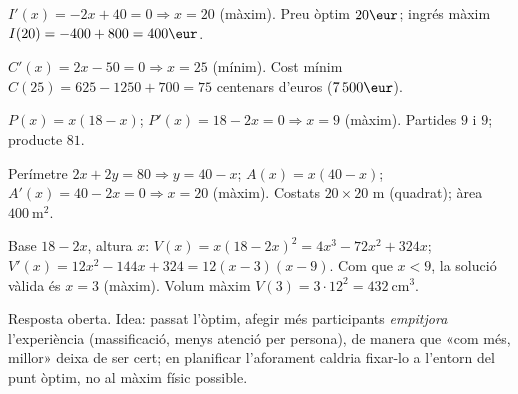 \begin{solucions}
\begin{sollist}
  \item $I'(x)=-2x+40=0\Rightarrow x=20$ (màxim). Preu òptim $20\eur$; ingrés màxim
        $I(20)=-400+800=400\eur$.
  \item $C'(x)=2x-50=0\Rightarrow x=25$ (mínim). Cost mínim $C(25)=625-1250+700=75$
        centenars d'euros ($7\,500\eur$).
  \item $P(x)=x(18-x)$; $P'(x)=18-2x=0\Rightarrow x=9$ (màxim). Partides $9$ i $9$;
        producte $81$.
  \item Perímetre $2x+2y=80\Rightarrow y=40-x$; $A(x)=x(40-x)$;
        $A'(x)=40-2x=0\Rightarrow x=20$ (màxim). Costats $20\times 20$ m (quadrat); àrea
        $400\ \text{m}^2$.
  \item Base $18-2x$, altura $x$: $V(x)=x(18-2x)^2=4x^3-72x^2+324x$;
        $V'(x)=12x^2-144x+324=12(x-3)(x-9)$. Com que $x<9$, la solució vàlida és $x=3$
        (màxim). Volum màxim $V(3)=3\cdot 12^2=432\ \text{cm}^3$.
  \item Resposta oberta. Idea: passat l'òptim, afegir més participants \emph{empitjora}
        l'experiència (massificació, menys atenció per persona), de manera que «com més,
        millor» deixa de ser cert; en planificar l'aforament caldria fixar-lo a l'entorn
        del punt òptim, no al màxim físic possible.
\end{sollist}
\end{solucions}
